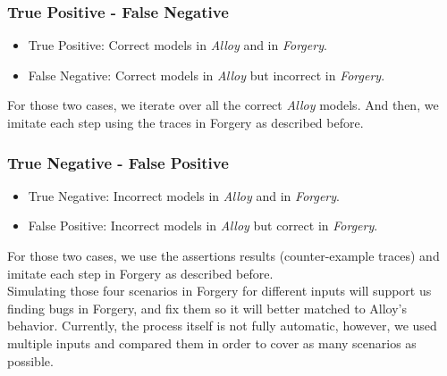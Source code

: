 \documentclass[oneside]{book}
\begin{document}

\subsubsection{True Positive - False Negative}
\begin{itemize}
  \item True Positive: Correct models in \textit{Alloy} and in \textit{Forgery}.
  \item False Negative: Correct models in \textit{Alloy} but incorrect in \textit{Forgery}.
\end{itemize}

For those two cases, we iterate over all the correct \textit{Alloy} models. And then, we imitate each step using the traces in Forgery as described before.

\subsubsection{True Negative - False Positive}
\begin{itemize}
  \item True Negative: Incorrect models in \textit{Alloy} and in \textit{Forgery}.
  \item False Positive: Incorrect models in \textit{Alloy} but correct in \textit{Forgery}.
\end{itemize}

For those two cases, we use the assertions results (counter-example traces) and imitate each step in Forgery as described before.\\

Simulating those four scenarios in Forgery for different inputs will support us finding bugs in Forgery, and fix them so it will better matched to Alloy's behavior. Currently, the process itself is not fully automatic, however, we used multiple inputs and compared them in order to cover as many scenarios as possible.
\end{document}
